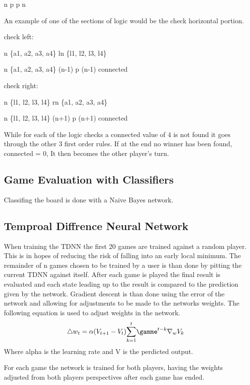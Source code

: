 \documentclass[12pt,letterpaper]{article}
\begin{document}
\exists n \ni p  \bigwedge p \in n

An example of one of the sections of logic would be the check horizontal portion.

check left:

n \in \{a1, a2, a3, a4\} \Rightarrow ln \in \{l1, l2, l3, l4\}



\neg n \in \{a1, a2, a3, a4\} \bigwedge (n-1)  \bigwedge p \in (n-1) \Rightarrow connected

check right:

n \in \{l1, l2, l3, l4\} \Rightarrow rn \in \{a1, a2, a3, a4\}

\neg n \in \{l1, l2, l3, l4\} \bigwedge (n+1)  \bigwedge p \in (n+1) \Rightarrow connected \newline

While for each of the logic checks a connected value of 4 is not found it goes through the other 3 first order rules. If at the end no winner has been found, connected = 0, It then becomes the other player’s turn.

\subsection{Game Evaluation with Classifiers}
Classifing the board is done with a Naive Bayes network. 

\subsection{Temproal Diffrence Neural Network}
When training the TDNN the first 20 games are trained against a random player. This is in hopes of reducing the risk of falling into an early local minimum. The remainder of n games chosen to be trained by a user is than done by pitting the current TDNN against itself. After each game is played the final result is evaluated and each state leading up to the result is compared to the prediction given by the network. Gradient descent is than done using the error of the network and allowing for adjustments to be made to the networks weights. The following equation is used to adjust weights in the network. 
\[
{\triangle} w_t = \alpha (V _{t + 1} - V _t)  \overset{t}{\sum_{k = 1}} {\gamme}^{t - k} {\nabla}_w V_k
\]
Where alpha is the learning rate and V is the perdicted output.

For each game the network is trained for both players, having the weights adjusted from both players perspectives after each game has ended.
\end{document}

